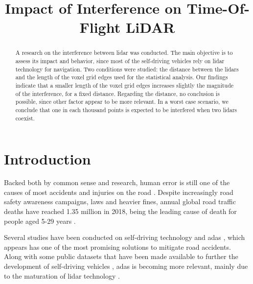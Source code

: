 \documentclass[extendedabs]{recpad2k}
\title{Impact of Interference on Time-Of-Flight LiDAR}
\begin{document}
\maketitle



\begin{abstract}
A research on the interference between \gls{lidar} was conducted. The main objective is to assess its impact and behavior, since most of the self-driving vehicles rely on \gls{lidar} technology for navigation. Two conditions were studied: the distance between the \gls{lidar}s and the length of the voxel grid edges used for the statistical analysis. Our findings indicate that a smaller length of the voxel grid edges increases slightly the magnitude of the interference, for a fixed distance. Regarding the distance, no conclusion is possible, since other factor appear to be more relevant. In a worst case scenario, we conclude that one in each thousand points is expected to be interfered when two \gls{lidar}s coexist.
\end{abstract}

\section{Introduction}
\label{sec:intro}

Backed both by common sense and research, human error is still one of the causes of most accidents and injuries on the road \cite{Bimbraw2015, world2019global}. Despite increasingly road safety awareness campaigns, laws and heavier fines, annual global road traffic deaths have reached 1.35 million in 2018, being the leading cause of death for people aged 5-29 years \cite{world2019global}.

Several studies have been conducted on self-driving technology and \Gls{adas} \cite{Fridman2017, ADAS1, Bimbraw2015}, which appears has one of the most promising solutions to mitigate road accidents. Along with some public datasets that have been made available to further the development of self-driving vehicles \cite{Geiger2012}, \gls{adas} is becoming more relevant, mainly due to the maturation of \gls{lidar} technology \cite{Sullivan2016}. 
\end{document}
